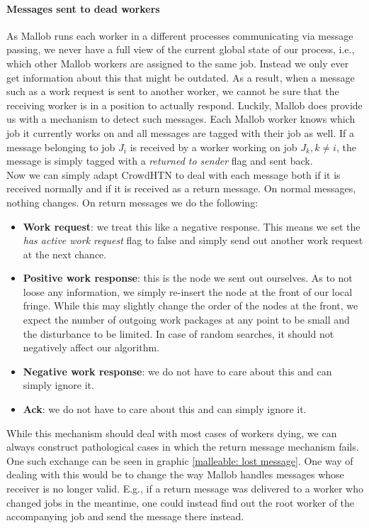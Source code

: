 \paragraph{Messages sent to dead workers}
As Mallob runs each worker in a different processes communicating via message passing, we never have a full view of the current global state of our process, i.e., which other Mallob workers are assigned to the same job. Instead we only ever get information about this that might be outdated. As a result, when a message such as a work request is sent to another worker, we cannot be sure that the receiving worker is in a position to actually respond. Luckily, Mallob does provide us with a mechanism to detect such messages. Each Mallob worker knows which job it currently works on and all messages are tagged with their job as well. If a message belonging to job $J_i$ is received by a worker working on job $J_k, k \neq i$, the message is simply tagged with a \textit{returned to sender} flag and sent back. \\
Now we can simply adapt CrowdHTN to deal with each message both if it is received normally and if it is received as a return message. On normal messages, nothing changes. On return messages we do the following:
\begin{itemize}
	\item \textbf{Work request}: we treat this like a negative response. This means we set the \textit{has active work request} flag to false and simply send out another work request at the next chance.
	\item \textbf{Positive work response}: this is the node we sent out ourselves. As to not loose any information, we simply re-insert the node at the front of our local fringe. While this may slightly change the order of the nodes at the front, we expect the number of outgoing work packages at any point to be small and the disturbance to be limited. In case of random searches, it should not negatively affect our algorithm.
	\item \textbf{Negative work response}: we do not have to care about this and can simply ignore it.
	\item \textbf{Ack}: we do not have to care about this and can simply ignore it.
\end{itemize}
While this mechanism should deal with most cases of workers dying, we can always construct pathological cases in which the return message mechanism fails. One such exchange can be seen in graphic \ref{malleable: lost message}. One way of dealing with this would be to change the way Mallob handles messages whose receiver is no longer valid. E.g., if a return message was delivered to a worker who changed jobs in the meantime, one could instead find out the root worker of the accompanying job and send the message there instead.
